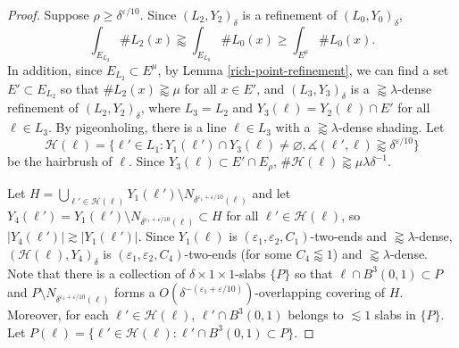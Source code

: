 \documentclass{amsart}
\numberwithin{equation}{section}
\newcommand{\de}{\delta}
\newcommand{\e}{\varepsilon}
\newcommand{\la}{\lambda}
\newcommand{\ch}{\mathcal H}
\newcommand{\ang}{\measuredangle}
\begin{document}
\begin{proof}
\smallskip

Suppose $\rho\geq\de^{\e/10}$.
Since $(L_2, Y_2)_\de$ is a refinement of $(L_0, Y_0)_\de$, 
\begin{equation}
    \int_{E_{L_2}}\#L_2(x)\gtrapprox\int_{E_{L_0}}\#L_0(x)\geq\int_{E^\mu}\#L_0(x).
\end{equation}
In addition, since $E_{L_2}\subset E^\mu$, by Lemma \ref{rich-point-refinement}, we can find a set $E'\subset E_{L_2}$ so that $\# L_2(x)\gtrapprox\mu$ for all $x\in E'$, and $(L_3, Y_3)_\de$ is a $\gtrapprox \la $-dense refinement of $(L_2, Y_2)_\de$, where $L_3=L_2$ and $Y_3(\ell)=Y_2(\ell)\cap E'$ for all $\ell\in L_3$.
By pigeonholing, there is a line $\ell\in L_3$ with a $\gtrapprox \la $-dense shading.
Let
\begin{equation}
    \ch(\ell)=\{\ell'\in L_1: Y_1(\ell')\cap Y_3(\ell)\not=\varnothing, \ang(\ell',\ell)\gtrapprox\de^{\e/10}\}
\end{equation}
be the hairbrush of $\ell$. 
Since $Y_3(\ell)\subset E'\cap E_\rho$, $\#\ch(\ell)\gtrapprox \mu\la\de^{-1}$.



Let $H=\bigcup_{\ell'\in\ch(\ell)} Y_1(\ell')\setminus N_{\de^{\e_1+\e/10}(\ell)}$ and let $Y_4(\ell')=Y_1(\ell')\setminus N_{\de^{\e_1+\e/10}(\ell)} \subset H$ for all $\ell'\in \ch(\ell)$, so $|Y_4(\ell')|\gtrsim|Y_1(\ell')|$.
Since $Y_1(\ell)$ is $(\e_1, \e_2, C_1)$-two-ends and $\gtrapprox \la $-dense, $(\ch(\ell), Y_4)_\de$ is $(\e_1, \e_2, C_4)$-two-ends (for some $C_4\lessapprox 1$) and $\gtrapprox \la $-dense.
Note that there is a collection of $\de\times1\times1$-slabs $\{P\}$ so that $\ell\cap B^3(0,1)\subset P$ and $P\setminus N_{\de^{\e_1+\e/10}(\ell)}$ forms a $O(\de^{-(\e_1+\e/10)})$-overlapping covering of $H$. 
Moreover, for each $\ell'\in\ch(\ell)$, $\ell'\cap B^3(0,1)$ belongs to $\lesssim 1$ slabs in $\{P\}$. 
Let $ P(\ell)=\{\ell'\in \ch(\ell):  \ell'\cap B^3(0,1)\subset P\}$. 


\end{proof}
\end{document}
